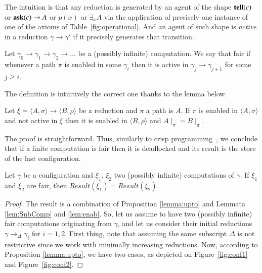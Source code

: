 \documentclass[main.tex]{subfiles}
\begin{document}
The intuition is that any reduction is generated by an agent of the shape $\mathit{{\bf tell}}(c)$ or  $\mathit{{\bf ask}}(c) \rightarrow A$ 
or $p(x)$ or $\exists_x A$ via the application of precisely one instance of one of the axioms
of Table~\ref{fig:operational}.
%
And an agent of such  shape is \emph{active} in a reduction $\gamma \rightarrow \gamma'$ if 
it precisely generates that transition.

\begin{definition}\label{def:fair}
Let $\gamma_0  \rightarrow \gamma_1  \rightarrow \gamma_2 \rightarrow \dots$ be a
(possibly infinite) computation. 
We say that fair if whenever a path
$\pi$ is enabled in some $\gamma_i$ then it is active in  
$\gamma_j  \rightarrow \gamma_{j+1}$ 
for some $j \geq i$.
\end{definition}

The definition is intuitively the correct one thanks to the lemma below.

\begin{lemma}
\label{lem:enab}
Let $\xi = \langle A, \sigma \rangle \rightarrow \langle B, \rho \rangle$ be a reduction
and $\pi$ a path is $A$. 
If $\pi$ is enabled in $\langle A, \sigma \rangle$ and not active in $\xi$ then it is enabled in 
$\langle B, \rho \rangle$ and $A\mid_{\pi} = B\mid_{\pi}$.
\end{lemma}

The proof is straightforward. Thus, 
similarly to crisp programming~\cite{popl91}, we conclude that 
if a finite computation is fair
then it is deadlocked and its result is the store of the last configuration.

\begin{theorem}[Confluence]\label{prop:confluence}
Let $\gamma$ be a configuration and $\xi_1$, $\xi_2$ two (possibly infinite)
computations of $\gamma$.
%
If $\xi_1$ and $\xi_2$ are fair, then $\mathit{Result}(\xi_1) = \mathit{Result}(\xi_2)$.
\end{theorem}

\begin{proof}
The result is a combination of Proposition \ref{lemma:upto} and Lemmata \ref{lem:SubComp}
and \ref{lem:enab}. So, let us assume to have two (possibly infinite) fair computations originating from $\gamma$, and let us consider their initial reductions $\gamma \rightarrow_\Delta \gamma_i$ 
for $i =  1, 2$. 
First thing, note that assuming the same subscript $\Delta$ is not restrictive since we work with minimally increasing reductions.
%
Now, according to Proposition \ref{lemma:upto}, we have two cases, as depicted on Figure~\ref{fig:conf1} and Figure~\ref{fig:conf2}.
\end{proof}
\end{document}
